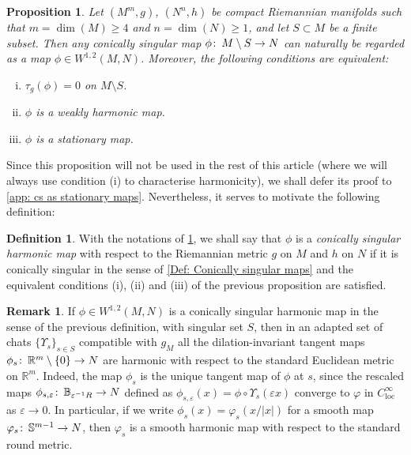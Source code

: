 \documentclass{article}
\numberwithin{equation}{section}        %
\theoremstyle{bfnote}
\newtheorem{prop}[thm]{Proposition}         %
\theoremstyle{definition}
\newtheorem{Def}[thm]{Definition}           %
\theoremstyle{bfremark}
\newtheorem{rem}[thm]{Remark}               %
\newcommand{\col}{\colon \thinspace}        %
\newcommand{\R}{\mathbb{R}}                 %
\newcommand{\Sp}{\mathbb{S}}                %
\begin{document}
\begin{prop}        \label{prop: equivalent conditions cs harmonic}
    Let $(M^m,g)$, $(N^n,h)$ be compact Riemannian manifolds such that $m = \dim(M) \geq 4$ and $n = \dim(N) \geq 1$, and let $S \subset M$ be a finite subset. Then any conically singular map $\phi \col M \setminus S \to N$ can naturally be regarded as a map $\phi \in W^{1,2}(M,N)$. Moreover, the following conditions are equivalent:
    \begin{enumerate}[(i)]
        \item $\tau_g(\phi) = 0$ on $M \setminus S$.
        \item $\phi$ is a weakly harmonic map.
        \item $\phi$ is a stationary map.
    \end{enumerate}
\end{prop}

Since this proposition will not be used in the rest of this article (where we will always use condition (i) to characterise harmonicity), we shall defer its proof to \cref{app: cs as stationary maps}. Nevertheless, it serves to motivate the following definition:

\begin{Def}
    With the notations of \cref{prop: equivalent conditions cs harmonic}, we shall say that $\phi$ is a \emph{conically singular harmonic map} with respect to the Riemannian metric $g$ on $M$ and $h$ on $N$ if it is conically singular in the sense of \cref{Def: Conically singular maps} and the equivalent conditions (i), (ii) and (iii) of the previous proposition are satisfied.
\end{Def}

\begin{rem}
    If $\phi \in W^{1,2}(M,N)$ is a conically singular harmonic map in the sense of the previous definition, with singular set $S$, then in an adapted set of chats $\{\Upsilon_s\}_{s \in S}$ compatible with $g_M$ all the dilation-invariant tangent maps $\phi_s \col \R^m \setminus \{0\} \to N$ are harmonic with respect to the standard Euclidean metric on $\R^m$. Indeed, the map $\phi_s$ is the unique tangent map of $\phi$ at $s$, since the rescaled maps $\phi_{s,\varepsilon} \col \mathbb{B}_{\varepsilon^{-1} R} \rightarrow N$ defined as $\phi_{s,\varepsilon}(x) = \phi \circ \Upsilon_s(\varepsilon x)$ converge to $\varphi$ in $C^\infty_{\mathrm{loc}}$ as $\varepsilon \rightarrow 0$. In particular, if we write $\phi_s(x) = \varphi_s(x/|x|)$ for a smooth map $\varphi_s \col \Sp^{m-1} \to N$, then $\varphi_s$ is a smooth harmonic map with respect to the standard round metric.
\end{rem}
\end{document}
